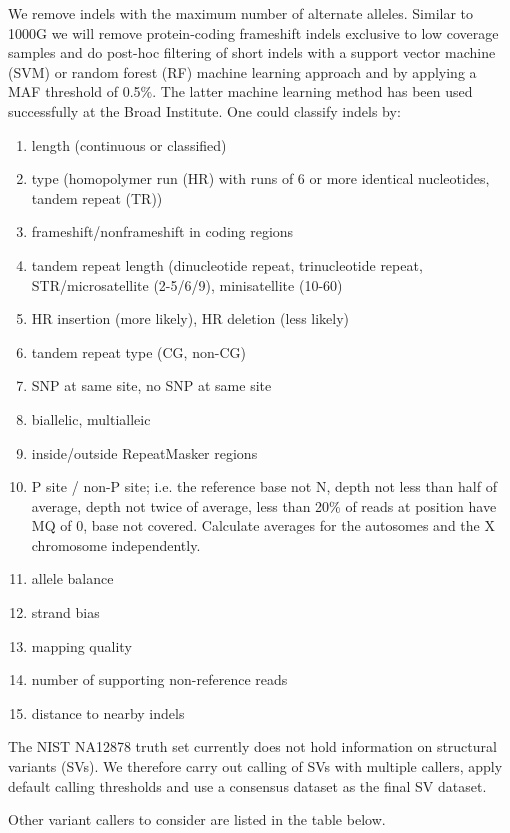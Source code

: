 We remove indels with the maximum number of alternate alleles.
Similar to 1000G we will remove protein-coding frameshift indels exclusive to low coverage samples and do post-hoc filtering of short indels with a support vector machine (SVM) or random forest (RF) machine learning approach and by applying a MAF threshold of 0.5\%. The latter machine learning method has been used successfully at the Broad Institute. One could classify indels by:
\begin{enumerate}
\item length (continuous or classified)
\item type (homopolymer run (HR) with runs of 6 or more identical nucleotides, tandem repeat (TR))
\item frameshift/nonframeshift in coding regions
\item tandem repeat length (dinucleotide repeat, trinucleotide repeat, STR/microsatellite (2-5/6/9), minisatellite (10-60)
\item HR insertion (more likely), HR deletion (less likely)
\item tandem repeat type (CG, non-CG)
\item SNP at same site, no SNP at same site
\item biallelic, multialleic
\item inside/outside RepeatMasker regions
\item P site / non-P site; i.e. the reference base not N, depth not less than half of average, depth not twice of average, less than 20\% of reads at position have MQ of 0, base not covered. Calculate averages for the autosomes and the X chromosome independently.
\item allele balance
\item strand bias
\item mapping quality
\item number of supporting non-reference reads
\item distance to nearby indels
\end{enumerate}

The NIST NA12878 truth set currently does not hold information on structural variants (SVs). We therefore carry out calling of SVs with multiple callers, apply default calling thresholds and use a consensus dataset as the final SV dataset.

Other variant callers to consider are listed in the table below.


